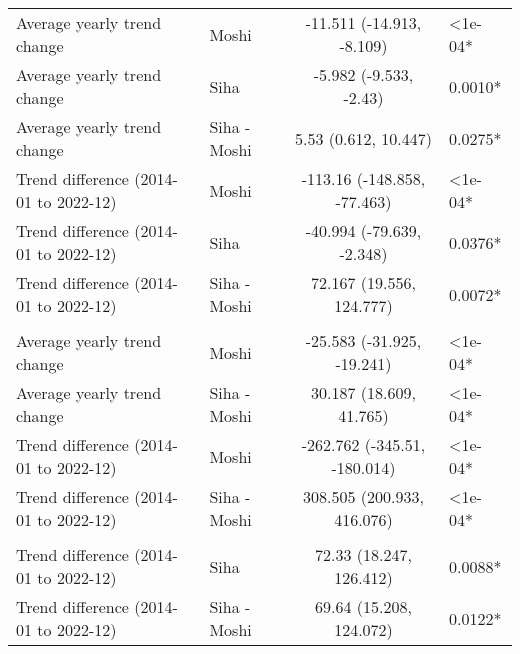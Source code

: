 \begin{longtable}{l|lcl}
\midrule\addlinespace[2.5pt]
Average yearly trend change & Moshi & -11.511 (-14.913, -8.109) & <1e-04* \\ 
Average yearly trend change & Siha & -5.982 (-9.533, -2.43) & 0.0010* \\ 
Average yearly trend change & Siha - Moshi & 5.53 (0.612, 10.447) & 0.0275* \\ 
Trend difference (2014-01 to 2022-12) & Moshi & -113.16 (-148.858, -77.463) & <1e-04* \\ 
Trend difference (2014-01 to 2022-12) & Siha & -40.994 (-79.639, -2.348) & 0.0376* \\ 
Trend difference (2014-01 to 2022-12) & Siha - Moshi & 72.167 (19.556, 124.777) & 0.0072* \\ 
\midrule\addlinespace[2.5pt]
\multicolumn{4}{l}{Other Communicable Diseases} \\[2.5pt] 
\midrule\addlinespace[2.5pt]
Average yearly trend change & Moshi & -25.583 (-31.925, -19.241) & <1e-04* \\ 
Average yearly trend change & Siha - Moshi & 30.187 (18.609, 41.765) & <1e-04* \\ 
Trend difference (2014-01 to 2022-12) & Moshi & -262.762 (-345.51, -180.014) & <1e-04* \\ 
Trend difference (2014-01 to 2022-12) & Siha - Moshi & 308.505 (200.933, 416.076) & <1e-04* \\ 
\midrule\addlinespace[2.5pt]
\multicolumn{4}{l}{Cancer} \\[2.5pt] 
\midrule\addlinespace[2.5pt]
Trend difference (2014-01 to 2022-12) & Siha & 72.33 (18.247, 126.412) & 0.0088* \\ 
Trend difference (2014-01 to 2022-12) & Siha - Moshi & 69.64 (15.208, 124.072) & 0.0122* \\ 
\bottomrule
\end{longtable}
\endgroup


